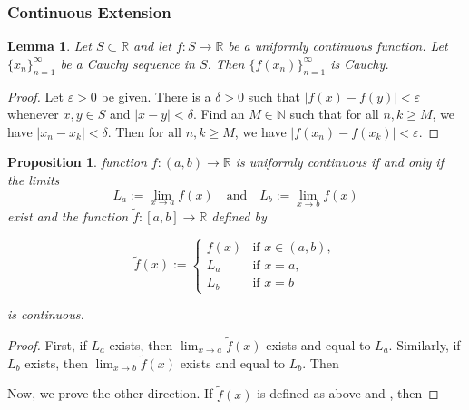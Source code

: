 \documentclass{article}
\newtheorem{lemma}[theorem]{Lemma}
\newtheorem{prop}[theorem]{Proposition}
\theoremstyle{definition}
\begin{document}
\subsubsection{Continuous Extension}

\begin{lemma}
    Let \( S \subset \mathbb{R} \) and let \( f: S \rightarrow \mathbb{R} \) be a uniformly continuous function. Let \( \{x_n\}_{n=1}^{\infty} \) be a Cauchy sequence in \( S \). Then \( \{f(x_n)\}_{n=1}^{\infty} \) is Cauchy.
\end{lemma}

\begin{proof}
    Let \( \varepsilon > 0 \) be given. There is a \( \delta > 0 \) such that \( |f(x) - f(y)| < \varepsilon \) whenever \( x, y \in S \) and \( |x - y| < \delta \). Find an \( M \in \mathbb{N} \) such that for all \( n, k \geq M \), we have \( |x_n - x_k| < \delta \). Then for all \( n, k \geq M \), we have \( |f(x_n) - f(x_k)| < \varepsilon \). 
\end{proof}

\begin{prop}
    function \( f: (a, b) \rightarrow \mathbb{R} \) is uniformly continuous if and only if the limits
    \[
    L_a := \lim_{x \rightarrow a} f(x) \quad \text{and} \quad L_b := \lim_{x \rightarrow b} f(x)
    \]
    exist and the function \( \widetilde{f}: [a, b] \rightarrow \mathbb{R} \) defined by
    
    $$\widetilde{f}(x) := \begin{cases} 
    f(x) & \text{if } x \in (a, b), \\
    L_a & \text{if } x = a, \\
    L_b & \text{if } x = b
    \end{cases}$$
    
    is continuous.
\end{prop}




\begin{proof}
    
First, if $L_a$ exists, then $\lim_{x\to a}\widetilde{f}(x)$ exists and equal to $L_a$. Similarly, if $L_b$ exists, then $\lim_{x\to b}\widetilde{f}(x)$ exists and equal to $L_b$. Then 

Now, we prove the other direction. If $\widetilde{f}(x)$ is defined as above and , then 





\end{proof}
\end{document}
